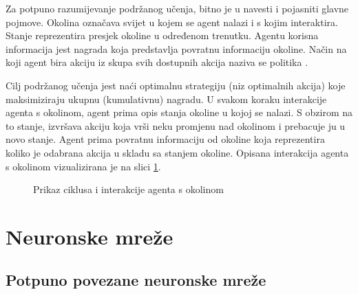 Za potpuno razumijevanje podržanog učenja, bitno je u navesti i pojasniti glavne pojmove. Okolina  označava svijet u kojem se agent nalazi i s kojim interaktira. Stanje  reprezentira presjek okoline u određenom trenutku. Agentu korisna informacija jest nagrada  koja predstavlja povratnu informaciju okoline. Način na koji agent bira akciju  iz skupa svih dostupnih akcija naziva se politika . 

Cilj podržanog učenja jest naći optimalnu strategiju (niz optimalnih akcija) koje maksimiziraju ukupnu (kumulativnu) nagradu. U svakom koraku interakcije agenta s okolinom, agent prima opis stanja okoline u kojoj se nalazi. S obzirom na to stanje, izvršava akciju koja vrši neku promjenu nad okolinom i prebacuje ju u novo stanje. Agent prima povratnu informaciju od okoline koja reprezentira koliko je odabrana akcija u skladu sa stanjem okoline. Opisana interakcija agenta s okolinom vizualizirana je na slici \ref{fig:rl}.

\begin{figure}[h]
    \centering
    \caption{Prikaz ciklusa i interakcije agenta s okolinom}
    \label{fig:rl}
\end{figure}

\section{Neuronske mreže}

\subsection{Potpuno povezane neuronske mreže}

